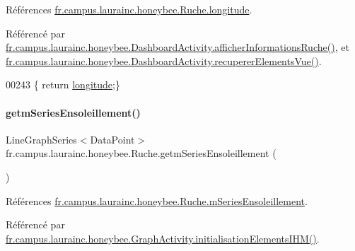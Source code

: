 Références \hyperlink{classfr_1_1campus_1_1laurainc_1_1honeybee_1_1_ruche_a298a62f192d8f018fa5f4bd5b3d8c157}{fr.\+campus.\+laurainc.\+honeybee.\+Ruche.\+longitude}.



Référencé par \hyperlink{classfr_1_1campus_1_1laurainc_1_1honeybee_1_1_dashboard_activity_a88f00531bee33bd6c47b33f5ac4df9ed}{fr.\+campus.\+laurainc.\+honeybee.\+Dashboard\+Activity.\+afficher\+Informations\+Ruche()}, et \hyperlink{classfr_1_1campus_1_1laurainc_1_1honeybee_1_1_dashboard_activity_a2ab46c5580913347e2dd18976be5900a}{fr.\+campus.\+laurainc.\+honeybee.\+Dashboard\+Activity.\+recuperer\+Elements\+Vue()}.


\begin{DoxyCode}
00243 \{ \textcolor{keywordflow}{return} \hyperlink{classfr_1_1campus_1_1laurainc_1_1honeybee_1_1_ruche_a298a62f192d8f018fa5f4bd5b3d8c157}{longitude};\}
\end{DoxyCode}
\mbox{\label{classfr_1_1campus_1_1laurainc_1_1honeybee_1_1_ruche_afb6dfa76b8c8c35151face6a5fe32044}} 
\paragraph{\texorpdfstring{getm\+Series\+Ensoleillement()}{getmSeriesEnsoleillement()}}
{\footnotesize\ttfamily Line\+Graph\+Series$<$Data\+Point$>$ fr.\+campus.\+laurainc.\+honeybee.\+Ruche.\+getm\+Series\+Ensoleillement (\begin{DoxyParamCaption}{ }\end{DoxyParamCaption})}



Références \hyperlink{classfr_1_1campus_1_1laurainc_1_1honeybee_1_1_ruche_a46b1a74ed27674490aff13504ce39b5a}{fr.\+campus.\+laurainc.\+honeybee.\+Ruche.\+m\+Series\+Ensoleillement}.



Référencé par \hyperlink{classfr_1_1campus_1_1laurainc_1_1honeybee_1_1_graph_activity_a7000895983725c6f795f7c73c1fafd20}{fr.\+campus.\+laurainc.\+honeybee.\+Graph\+Activity.\+initialisation\+Elements\+I\+H\+M()}.


